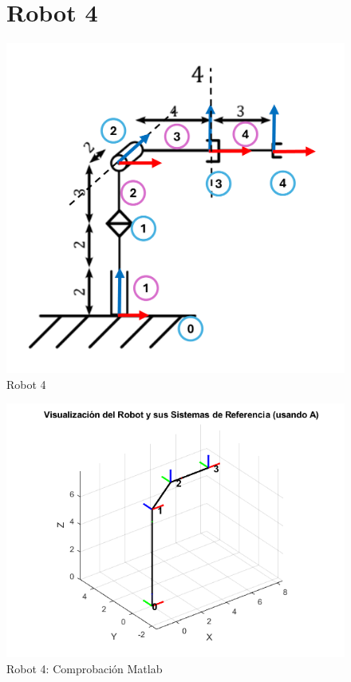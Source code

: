\begin{figure}[h]
	\section{Robot 4}
	\centering
	{%
		\includegraphics[width=0.5\linewidth]{img/Robot4_1}
		\caption{Robot 4}
		\label{fig:robot41}
	}
\end{figure}
\begin{figure}[h]
	\centering
	{%
		\includegraphics[width=0.7\linewidth]{img/Robot4}
		\caption{Robot 4: Comprobación Matlab}
		\label{fig:robot4}
	}
\end{figure}
